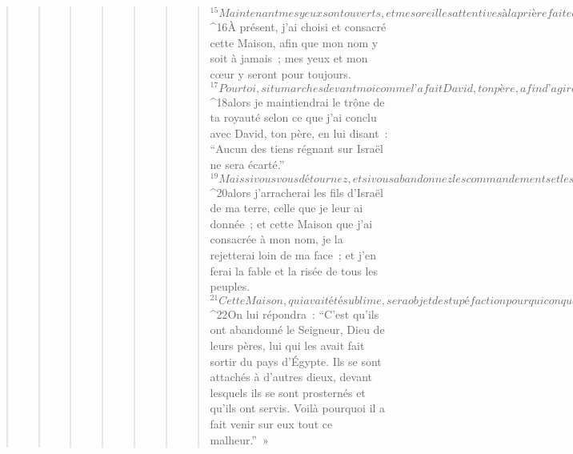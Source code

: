 \begin{verse}
\begin{verse}
\begin{verse}
\begin{verse}
\begin{verse}
\begin{verse}
\begin{verse}
${}^{15}Maintenant mes yeux sont ouverts, et mes oreilles attentives à la prière faite en ce lieu. 
${}^{16}À présent, j’ai choisi et consacré cette Maison, afin que mon nom y soit à jamais ; mes yeux et mon cœur y seront pour toujours. 
${}^{17}Pour toi, si tu marches devant moi comme l’a fait David, ton père, afin d’agir en tout selon mes commandements, et si tu gardes mes décrets et mes ordonnances, 
${}^{18}alors je maintiendrai le trône de ta royauté selon ce que j’ai conclu avec David, ton père, en lui disant : “Aucun des tiens régnant sur Israël ne sera écarté.”
${}^{19}Mais si vous vous détournez, et si vous abandonnez les commandements et les décrets que j’ai placés devant vous, si vous suivez et servez d’autres dieux et vous prosternez devant eux, 
${}^{20}alors j’arracherai les fils d’Israël de ma terre, celle que je leur ai donnée ; et cette Maison que j’ai consacrée à mon nom, je la rejetterai loin de ma face ; et j’en ferai la fable et la risée de tous les peuples. 
${}^{21}Cette Maison, qui avait été sublime, sera objet de stupéfaction pour quiconque passera près d’elle ; il dira : “Pourquoi donc le Seigneur a-t-il agi de cette manière envers ce pays et envers cette Maison ?” 
${}^{22}On lui répondra : “C’est qu’ils ont abandonné le Seigneur, Dieu de leurs pères, lui qui les avait fait sortir du pays d’Égypte. Ils se sont attachés à d’autres dieux, devant lesquels ils se sont prosternés et qu’ils ont servis. Voilà pourquoi il a fait venir sur eux tout ce malheur.” »
      

\end{verse}
\end{verse}
\end{verse}
\end{verse}
\end{verse}
\end{verse}
\end{verse}
